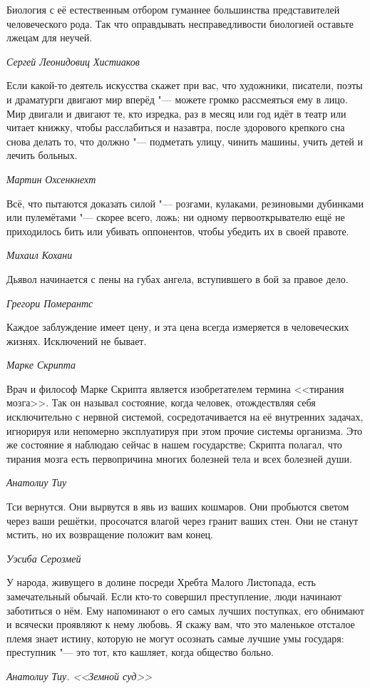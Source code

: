 \documentclass[a4paper,10pt]{book}
\begin{document}
\epigraph{Биология с её естественным отбором гуманнее большинства 
представителей 
человеческого рода. 
Так что оправдывать несправедливости биологией оставьте лжецам для неучей.}
{\textit{Сергей Леонидовиц Хистиаков}}

\epigraph{Если какой-то деятель искусства скажет при вас, что художники, 
писатели, поэты и драматурги двигают мир вперёд "--- можете громко рассмеяться 
ему в лицо. Мир двигали и двигают те, кто изредка, раз в месяц или год идёт в 
театр или читает книжку, чтобы расслабиться и назавтра, после здорового 
крепкого 
сна снова делать то, что должно "--- подметать улицу, чинить машины, учить 
детей 
и лечить больных.}
{\textit{Мартин Охсенкнехт}}

\epigraph{Всё, что пытаются доказать силой "--- розгами, кулаками, резиновыми 
дубинками или пулемётами "--- 
скорее всего, ложь; ни одному первооткрывателю ещё не приходилось бить или 
убивать оппонентов, 
чтобы убедить их в своей правоте.}
{\textit{Михаил Кохани}}

\epigraph{Дьявол начинается с пены на губах ангела, вступившего в бой за правое 
дело.}
{\textit{Грегори Померантс}}

\epigraph{Каждое заблуждение имеет цену, и эта цена всегда измеряется в 
человеческих жизнях. Исключений не бывает.}
{\textit{Марке Скрипта}}

 \epigraph{Врач и философ Марке Скрипта является изобретателем термина 
<<тирания 
мозга>>. Так он называл состояние, когда человек, отождествляя себя 
исключительно с нервной системой, сосредотачивается на её внутренних задачах, 
игнорируя или непомерно эксплуатируя при этом прочие системы организма. Это же 
состояние я наблюдаю сейчас в нашем государстве; Скрипта полагал, что тирания 
мозга есть первопричина многих болезней тела и всех болезней души.}
{\textit{Анатолиу Тиу}}
 
\epigraph{Тси вернутся. Они вырвутся в явь из ваших кошмаров. Они пробьются 
светом через ваши решётки, просочатся влагой через гранит ваших стен. Они не 
станут мстить, но их возвращение положит вам конец.}
{\textit{Уэсиба Серозмей}}

\epigraph{У народа, живущего в долине посреди Хребта Малого Листопада, есть 
замечательный обычай. Если кто-то совершил преступление, люди начинают 
заботиться о нём. Ему напоминают о его самых лучших поступках, его обнимают и 
всячески проявляют к нему любовь. Я скажу вам, что это маленькое отсталое племя 
знает истину, которую не могут осознать самые лучшие умы государя: преступник 
"--- это тот, кто кашляет, когда общество больно.}
{\textit{Анатолиу Тиу. <<Земной суд>>}}
\end{document}
